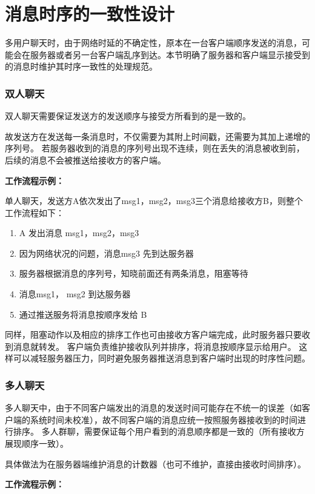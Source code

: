 {\color{red}
\section{消息时序的一致性设计}
多用户聊天时，由于网络时延的不确定性，原本在一台客户端顺序发送的消息，可能会在服务器或者另一台客户端乱序到达。本节明确了服务器和客户端显示接受到的消息时维护其时序一致性的处理规范。\\


\subsubsection{双人聊天}
双人聊天需要保证发送方的发送顺序与接受方所看到的是一致的。

故发送方在发送每一条消息时，不仅需要为其附上时间戳，还需要为其加上递增的序列号。
若服务器收到的消息的序列号出现不连续，则在丢失的消息被收到前，后续的消息不会被推送给接收方的客户端。

\textbf{工作流程示例：}

单人聊天，发送方A依次发出了msg1，msg2，msg3三个消息给接收方B，则整个工作流程如下：
\begin{enumerate}
	\item A 发出消息 msg1，msg2，msg3
	\item 因为网络状况的问题，消息msg3 先到达服务器
	\item 服务器根据消息的序列号，知晓前面还有两条消息，阻塞等待
	\item 消息msg1， msg2 到达服务器
	\item 通过推送服务将消息按顺序发给 B
\end{enumerate}

同样，阻塞动作以及相应的排序工作也可由接收方客户端完成，此时服务器只要收到消息就转发。
客户端负责维护接收队列并排序，将消息按顺序显示给用户。
这样可以减轻服务器压力，同时避免服务器推送消息到客户端时出现的时序性问题。

\subsubsection{多人聊天}
多人聊天中，由于不同客户端发出的消息的发送时间可能存在不统一的误差（如客户端的系统时间未校准），故不同客户端的消息应统一按照服务器接收到的时间进行排序。
多人群聊，需要保证每个用户看到的消息顺序都是一致的（所有接收方展现顺序一致）。

具体做法为在服务器端维护消息的计数器（也可不维护，直接由接收时间排序）。

\textbf{工作流程示例：}

}
